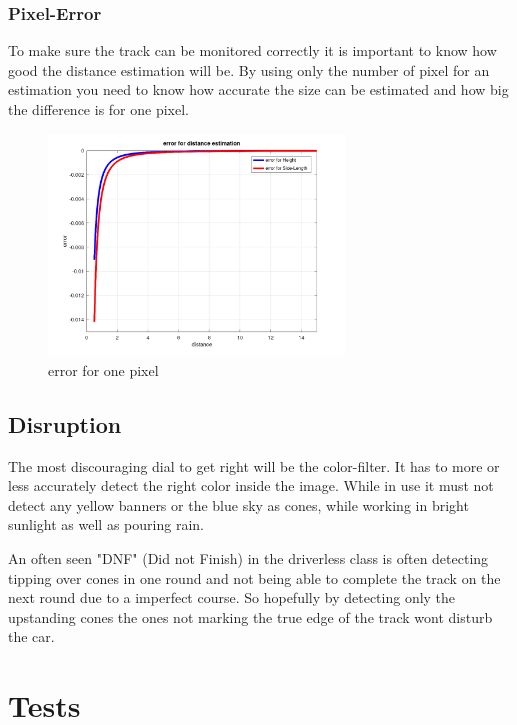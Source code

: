 \documentclass[10pt,a4paper]{article}
\begin{document}
	\subsubsection{Pixel-Error}
	To make sure the track can be monitored correctly it is important to know how good the distance estimation will be. By using only the number of pixel for an estimation you need to know how accurate the size can be estimated and how big the difference is for one pixel.
	\begin{figure}[h]
		\centering
		\includegraphics[width=0.7\textwidth]{Abb/pixel-error.png}
		\caption{error for one pixel}
		\label{error-pixel}
	\end{figure}
	
	\subsection{Disruption}
	The most discouraging dial to get right will be the color-filter. It has to more or less accurately detect the right color inside the image. While in use it must not detect any yellow banners or the blue sky as cones, while working in bright sunlight as well as pouring rain.
	
	An often seen "DNF" (Did not Finish) in the driverless class is often detecting tipping over cones in one round and not being able to complete the track on the next round due to a imperfect course. So hopefully by detecting only the upstanding cones the ones not marking the true edge of the track wont disturb the car.
	
	\section{Tests}
	
\end{document}
